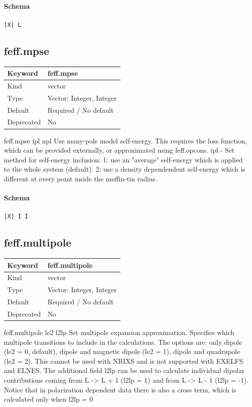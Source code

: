\documentclass[11pt]{article}
\begin{document}
{{{{\paragraph{Schema}
\begin{Verbatim}
|X| L
\end{Verbatim}

\subsection{feff.mpse}
\label{kw:feff-mpse}
\begin{longtable}{|p{1.5in}|p{4.5in}|}
\hline
Keyword & feff.mpse \\
\hline
Kind & vector \\
\hline
Type & Vector: Integer, Integer \\
\hline
Default & Required / No default \\
\hline
Deprecated & No \\
\hline
\end{longtable}
 feff.mpse{ ipl npl }
 Use many-pole model self-energy. This requires the loss function, which can
 be provided externally, or approximated using feff.opcons.
   ipl - Set method for self-energy inclusion:
          1: use an "average" self-energy which is applied to the whole
             system (default).
          2: use a density dependendent self-energy which is
             different at every point inside the muffin-tin radius.

\paragraph{Schema}
\begin{Verbatim}
|X| I I
\end{Verbatim}

\subsection{feff.multipole}
\label{kw:feff-multipole}
\begin{longtable}{|p{1.5in}|p{4.5in}|}
\hline
Keyword & feff.multipole \\
\hline
Kind & vector \\
\hline
Type & Vector: Integer, Integer \\
\hline
Default & Required / No default \\
\hline
Deprecated & No \\
\hline
\end{longtable}
 feff.multipole{ le2 l2lp }
 Set multipole expansion approximation. Specifies which multipole transitions
 to include in the calculations. The options are: only dipole (le2 = 0,
 default), dipole and magnetic dipole (le2 = 1), dipole and quadrupole
 (le2 = 2). This cannot be used with NRIXS and is not supported with EXELFS
 and ELNES. The additional field l2lp can be used to calculate individual
 dipolar contributions coming from L -> L + 1 (l2lp = 1) and from L -> L - 1
 (l2lp = -1). Notice that in polarization dependent data there is also a
 cross term, which is calculated only when l2lp = 0

}}}}
\end{document}
